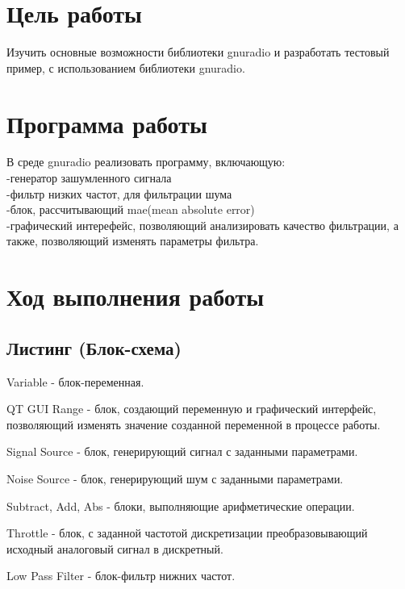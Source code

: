 







\section{Цель работы}
Изучить основные возможности библиотеки gnuradio и разработать тестовый пример, с использованием библиотеки gnuradio.

\section{Программа работы}
В среде gnuradio реализовать программу, включающую:
						\\-генератор зашумленного сигнала
						\\-фильтр низких частот, для фильтрации шума
						\\-блок, рассчитывающий mae(mean absolute error)
						\\-графический интерефейс, позволяющий анализировать качество фильтрации, а также, позволяющий изменять параметры фильтра.


\section{Ход выполнения работы}


\subsection{Листинг (Блок-схема)}

Variable - блок-переменная.

QT GUI Range - блок, создающий переменную и графический интерфейс, позволяющий изменять значение созданной переменной в процессе работы.

Signal Source - блок, генерирующий сигнал с заданными параметрами.

Noise Source - блок, генерирующий шум с заданными параметрами.

Subtract, Add, Abs - блоки, выполняющие арифметические операции.

Throttle - блок, с заданной частотой дискретизации преобразовывающий исходный аналоговый сигнал в дискретный.

Low Pass Filter - блок-фильтр нижних частот.

